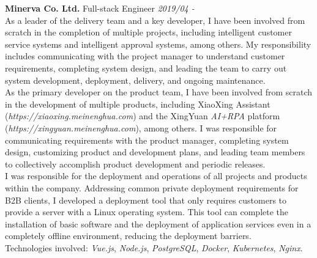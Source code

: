 \documentclass[a4paper]{article}
\newenvironment{changemargin}[2]{%
  \begin{list}{}{%
    \setlength{\topsep}{0pt}%
    \setlength{\leftmargin}{#1}%
    \setlength{\rightmargin}{#2}%
    \setlength{\listparindent}{\parindent}%
    \setlength{\itemindent}{\parindent}%
    \setlength{\parsep}{\parskip}%
  }%
  \item[]}{\end{list}
}
\newenvironment{body} {
	\vspace*{-16pt}
	\begin{changemargin}{-0.5in}{-0.5in}
  }
	{\end{changemargin}
}
\begin{document}
\begin{body}
	\vspace{14pt}
	\textbf{Minerva Co. Ltd.} \hfill Full-stack Engineer \emph{2019/04 - } \\
	\smallskip
	As a leader of the delivery team and a key developer, I have been involved from scratch in the completion of multiple projects, including intelligent customer service systems and intelligent approval systems, among others. My responsibility includes communicating with the project manager to understand customer requirements, completing system design, and leading the team to carry out system development, deployment, delivery, and ongoing maintenance.\\
	\vspace{4pt}
	As the primary developer on the product team, I have been involved from scratch in the development of multiple products, including XiaoXing Assistant (\emph{https://xiaoxing.meinenghua.com}) and the XingYuan \emph{AI+RPA} platform (\emph{https://xingyuan.meinenghua.com}), among others. I was responsible for communicating requirements with the product manager, completing system design, customizing product and development plans, and leading team members to collectively accomplish product development and periodic releases.\\
	\vspace{4pt}
	I was responsible for the deployment and operations of all projects and products within the company. Addressing common private deployment requirements for B2B clients, I developed a deployment tool that only requires customers to provide a server with a Linux operating system. This tool can complete the installation of basic software and the deployment of application services even in a completely offline environment, reducing the deployment barriers.\\
	\vspace{4pt}
	Technologies involved: \emph{Vue.js}, \emph{Node.js}, \emph{PostgreSQL}, \emph{Docker}, \emph{Kubernetes}, \emph{Nginx}.


\end{body}
\end{document}
